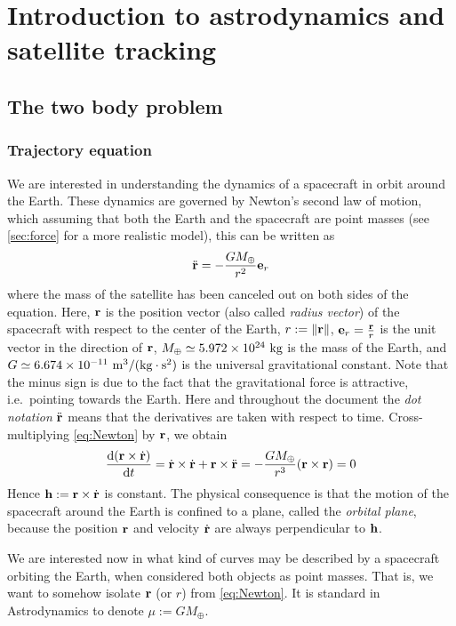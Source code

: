 \documentclass[../main.tex]{subfiles}
\begin{document}
\section{Introduction to astrodynamics and satellite tracking}
\subsection{The two body problem}\label{sec:twoBody}
\subsubsection{Trajectory equation}
We are interested in understanding the dynamics of a spacecraft in orbit around the Earth. These dynamics are governed by Newton's second law of motion, which assuming that both the Earth and the spacecraft are point masses (see \cref{sec:force} for a more realistic model), this can be written as
\begin{equation}
  \label{eq:Newton}
  \ddot{\boldsymbol{\mathrm{r}}}=-\frac{GM_{\oplus}}{r^2}\boldsymbol{\mathrm{e}}_r
\end{equation}
where the mass of the satellite has been canceled out on both sides of the equation. Here, $\boldsymbol{\mathrm{r}}$ is the position vector (also called \emph{radius vector}) of the spacecraft with respect to the center of the Earth, $r:=\left\|\boldsymbol{\mathrm{r}}\right\|$, $\boldsymbol{\mathrm{e}}_r=\frac{\boldsymbol{\mathrm{r}}}{r}$ is the unit vector in the direction of $\boldsymbol{\mathrm{r}}$, $M_{\oplus}\simeq 5.972\times 10^{24}\ \kg$ is the mass of the Earth, and $G\simeq 6.674\times 10^{-11}\ \mathrm{m}^3/ (\mathrm{kg}\cdot\mathrm{s}^2)$ is the universal gravitational constant. Note that the minus sign is due to the fact that the gravitational force is attractive, i.e.\ pointing towards the Earth.
Here and throughout the document the \emph{dot notation} $\ddot{\boldsymbol{\mathrm{r}}}$ means that the derivatives are taken with respect to time.
Cross-multiplying \cref{eq:Newton} by $\boldsymbol{\mathrm{r}}$, we obtain
\begin{equation}
  \dv{(\boldsymbol{\mathrm{r}}\times \dot{\boldsymbol{\mathrm{r}}})}{t}=\dot{\boldsymbol{\mathrm{r}}}\times \dot{\boldsymbol{\mathrm{r}}}+\boldsymbol{\mathrm{r}}\times\ddot{\boldsymbol{\mathrm{r}}}=-\frac{GM_{\oplus}}{r^3}(\boldsymbol{\mathrm{r}}\times \boldsymbol{\mathrm{r}})=0
\end{equation}
Hence $\boldsymbol{\mathrm{h}}:=\boldsymbol{\mathrm{r}}\times \dot{\boldsymbol{\mathrm{r}}}$ is constant. The physical consequence is that the motion of the spacecraft around the Earth is confined to a plane, called the \emph{orbital plane}, because the position $\boldsymbol{\mathrm{r}}$ and velocity $\dot{\boldsymbol{\mathrm{r}}}$ are always perpendicular to $\boldsymbol{\mathrm{h}}$.

We are interested now in what kind of curves may be described by a spacecraft orbiting the Earth, when considered both objects as point masses. That is, we want to somehow isolate $\boldsymbol{\mathrm{r}}$ (or $r$) from \cref{eq:Newton}. It is standard in Astrodynamics to denote $\mu:=GM_{\oplus}$.
\end{document}
